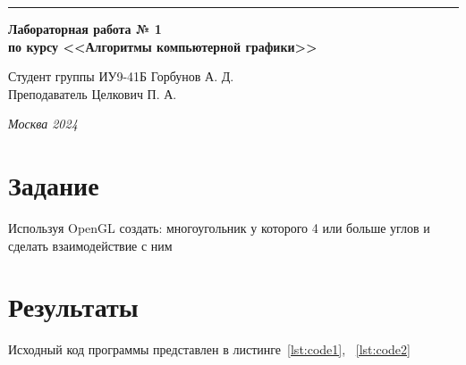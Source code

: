 \documentclass[a4paper, 14pt]{extarticle}
\begin{document}
\begin{titlepage}
\vspace*{-16pt}
\hspace{30pt}\rule{0.866\textwidth}{0.4pt}
  
\vspace{11em}

\begin{center}
\Large {\bf Лабораторная работа № 1} \\ 
\large {\bf по курсу <<Алгоритмы компьютерной графики>>} \\
\end{center}\normalsize

\vspace{8em}


\begin{flushright}
  {Студент группы ИУ9-41Б Горбунов А. Д. \hspace*{15pt}\\ 
  \vspace{2ex}
  Преподаватель Целкович П. А.\hspace*{15pt}}
\end{flushright}

\bigskip

\vfill
 

\begin{center}
\textsl{Москва 2024}
\end{center}
\end{titlepage}

\renewcommand{\ttdefault}{pcr}

\setlength{\tabcolsep}{3pt}
\newpage
\setcounter{page}{2}

\section{Задание}\label{Sect::task}
    Используя OpenGL создать: многоугольник у которого 4 или больше углов и сделать взаимодействие с ним

    
\section{Результаты}\label{Sect::res}

Исходный код программы представлен в листинге~\ref{lst:code1}, ~\ref{lst:code2}
\end{document}
